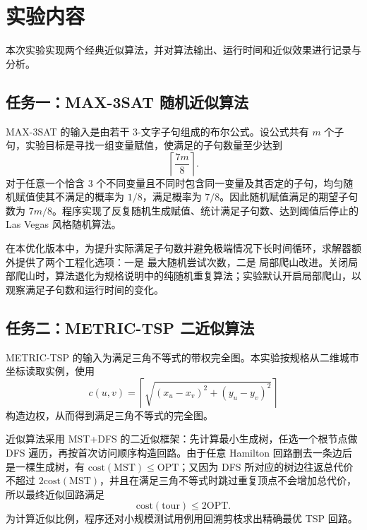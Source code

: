 \documentclass{sysucseexp}
\begin{document}

\makecover
\tableofcontents
\cleardoublepage
\pagestyle{main} %

\section{实验内容}

本次实验实现两个经典近似算法，并对算法输出、运行时间和近似效果进行记录与分析。

\subsection{任务一：MAX-3SAT 随机近似算法}

MAX-3SAT 的输入是由若干 3-文字子句组成的布尔公式。设公式共有 $m$ 个子句，实验目标是寻找一组变量赋值，使满足的子句数量至少达到
\[
  \left\lceil \frac{7m}{8} \right\rceil .
\]
对于任意一个恰含 3 个不同变量且不同时包含同一变量及其否定的子句，均匀随机赋值使其不满足的概率为 $1/8$，满足概率为 $7/8$。因此随机赋值满足的期望子句数为 $7m/8$。程序实现了反复随机生成赋值、统计满足子句数、达到阈值后停止的 Las Vegas 风格随机算法。

在本优化版本中，为提升实际满足子句数并避免极端情况下长时间循环，求解器额外提供了两个工程化选项：一是  最大随机尝试次数，二是  局部爬山改进。关闭局部爬山时，算法退化为规格说明中的纯随机重复算法；实验默认开启局部爬山，以观察满足子句数和运行时间的变化。

\subsection{任务二：METRIC-TSP 二近似算法}

METRIC-TSP 的输入为满足三角不等式的带权完全图。本实验按规格从二维城市坐标读取实例，使用
\[
  c(u,v)=\left\lceil \sqrt{(x_u-x_v)^2+(y_u-y_v)^2} \right\rceil
\]
构造边权，从而得到满足三角不等式的完全图。

近似算法采用 MST+DFS 的二近似框架：先计算最小生成树，任选一个根节点做 DFS 遍历，再按首次访问顺序构造回路。由于任意 Hamilton 回路删去一条边后是一棵生成树，有 $\mathrm{cost(MST)}\leq \mathrm{OPT}$；又因为 DFS 所对应的树边往返总代价不超过 $2\mathrm{cost(MST)}$，并且在满足三角不等式时跳过重复顶点不会增加总代价，所以最终近似回路满足
\[
  \mathrm{cost(tour)} \leq 2\mathrm{OPT}.
\]
为计算近似比例，程序还对小规模测试用例用回溯剪枝求出精确最优 TSP 回路。
\end{document}
